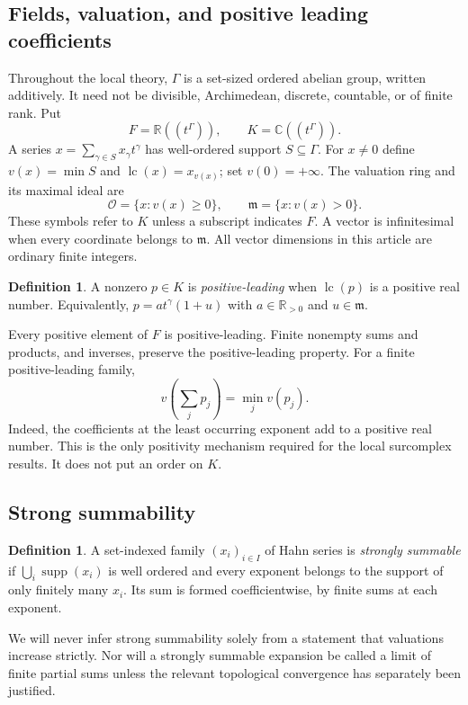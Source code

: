 \documentclass[11pt,a4paper]{article}
\numberwithin{equation}{section}
\theoremstyle{definition}
\newtheorem{definition}[theorem]{Definition}
\newcommand{\R}{\mathbb R}
\newcommand{\C}{\mathbb C}
\newcommand{\OO}{\mathcal O}
\newcommand{\mm}{\mathfrak m}
\newcommand{\supp}{\operatorname{supp}}
\newcommand{\lc}{\operatorname{lc}}
\begin{document}
\subsection{Fields, valuation, and positive leading coefficients}
Throughout the local theory, $\Gamma$ is a set-sized ordered abelian
group, written additively. It need not be divisible, Archimedean,
discrete, countable, or of finite rank. Put
\begin{equation}\label{scale:eq:fields}
 F=\R((t^\Gamma)),\qquad K=\C((t^\Gamma)).
\end{equation}
A series $x=\sum_{\gamma\in S}x_\gamma t^\gamma$ has well-ordered
support $S\subseteq\Gamma$. For $x\ne0$ define
$v(x)=\min S$ and $\lc(x)=x_{v(x)}$; set $v(0)=+\infty$.
The valuation ring and its maximal ideal are
\[
 \OO=\{x:v(x)\geq0\},\qquad \mm=\{x:v(x)>0\}.
\]
These symbols refer to $K$ unless a subscript indicates $F$.
A vector is infinitesimal when every coordinate belongs to $\mm$.
All vector dimensions in this article are ordinary finite integers.

\begin{definition}\label{scale:def:positiveleading}
A nonzero $p\in K$ is \emph{positive-leading} when $\lc(p)$ is a
positive real number. Equivalently,
$p=a t^\gamma(1+u)$ with $a\in\R_{>0}$ and $u\in\mm$.
\end{definition}
Every positive element of $F$ is positive-leading. Finite nonempty sums
and products, and inverses, preserve the positive-leading property.
For a finite positive-leading family,
\begin{equation}\label{scale:eq:nocancel}
 v\left(\sum_j p_j\right)=\min_j v(p_j).
\end{equation}
Indeed, the coefficients at the least occurring exponent add to a
positive real number. This is the only positivity mechanism required
for the local surcomplex results. It does not put an order on $K$.

\subsection{Strong summability}
\begin{definition}
A set-indexed family $(x_i)_{i\in I}$ of Hahn series is \emph{strongly
summable} if $\bigcup_i\supp(x_i)$ is well ordered and every exponent
belongs to the support of only finitely many $x_i$. Its sum is formed
coefficientwise, by finite sums at each exponent.
\end{definition}
We will never infer strong summability solely from a statement that
valuations increase strictly. Nor will a strongly summable expansion
be called a limit of finite partial sums unless the relevant
topological convergence has separately been justified.
\end{document}
